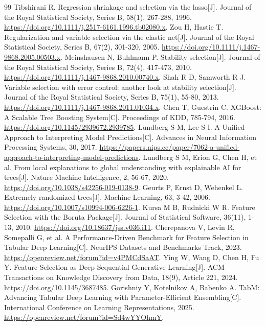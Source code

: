 \documentclass{sufethesismas}
\begin{document}
\backmatter
\begin{thebibliography}{99}
 Tibshirani R. Regression shrinkage and selection via the lasso[J]. Journal of the Royal Statistical Society, Series B, 58(1), 267-288, 1996. \url{https://doi.org/10.1111/j.2517-6161.1996.tb02080.x}.
 Zou H, Hastie T. Regularization and variable selection via the elastic net[J]. Journal of the Royal Statistical Society, Series B, 67(2), 301-320, 2005. \url{https://doi.org/10.1111/j.1467-9868.2005.00503.x}.
 Meinshausen N, Buhlmann P. Stability selection[J]. Journal of the Royal Statistical Society, Series B, 72(4), 417-473, 2010. \url{https://doi.org/10.1111/j.1467-9868.2010.00740.x}.
 Shah R D, Samworth R J. Variable selection with error control: another look at stability selection[J]. Journal of the Royal Statistical Society, Series B, 75(1), 55-80, 2013. \url{https://doi.org/10.1111/j.1467-9868.2011.01034.x}.
 Chen T, Guestrin C. XGBoost: A Scalable Tree Boosting System[C]. Proceedings of KDD, 785-794, 2016. \url{https://doi.org/10.1145/2939672.2939785}.
 Lundberg S M, Lee S I. A Unified Approach to Interpreting Model Predictions[C]. Advances in Neural Information Processing Systems, 30, 2017. \url{https://papers.nips.cc/paper/7062-a-unified-approach-to-interpreting-model-predictions}.
 Lundberg S M, Erion G, Chen H, et al. From local explanations to global understanding with explainable AI for trees[J]. Nature Machine Intelligence, 2, 56-67, 2020. \url{https://doi.org/10.1038/s42256-019-0138-9}.
 Geurts P, Ernst D, Wehenkel L. Extremely randomized trees[J]. Machine Learning, 63, 3-42, 2006. \url{https://doi.org/10.1007/s10994-006-6226-1}.
 Kursa M B, Rudnicki W R. Feature Selection with the Boruta Package[J]. Journal of Statistical Software, 36(11), 1-13, 2010. \url{https://doi.org/10.18637/jss.v036.i11}.
 Cherepanova V, Levin R, Somepalli G, et al. A Performance-Driven Benchmark for Feature Selection in Tabular Deep Learning[C]. NeurIPS Datasets and Benchmarks Track, 2023. \url{https://openreview.net/forum?id=v4PMCdSaAT}.
 Ying W, Wang D, Chen H, Fu Y. Feature Selection as Deep Sequential Generative Learning[J]. ACM Transactions on Knowledge Discovery from Data, 18(9), Article 221, 2024. \url{https://doi.org/10.1145/3687485}.
 Gorishniy Y, Kotelnikov A, Babenko A. TabM: Advancing Tabular Deep Learning with Parameter-Efficient Ensembling[C]. International Conference on Learning Representations, 2025. \url{https://openreview.net/forum?id=Sd4wYYOhmY}.

\end{thebibliography}
\end{document}
